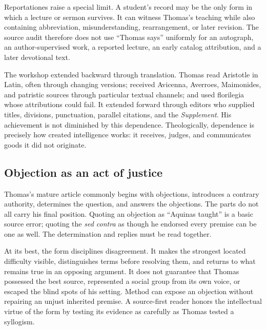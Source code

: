 Reportationes raise a special limit.  A student's record may be the only form
in which a lecture or sermon survives.  It can witness Thomas's teaching while
also containing abbreviation, misunderstanding, rearrangement, or later
revision.  The source audit therefore does not use ``Thomas says'' uniformly
for an autograph, an author-supervised work, a reported lecture, an early
catalog attribution, and a later devotional text.

The workshop extended backward through translation.  Thomas read Aristotle in
Latin, often through changing versions; received Avicenna, Averroes, Maimonides,
and patristic sources through particular textual channels; and used florilegia
whose attributions could fail.  It extended forward through editors who
supplied titles, divisions, punctuation, parallel citations, and the
\emph{Supplement}.  His achievement is not diminished by this dependence.
Theologically, dependence is precisely how created intelligence works: it
receives, judges, and communicates goods it did not originate.

\subsection{Objection as an act of justice}

Thomas's mature article commonly begins with objections, introduces a contrary
authority, determines the question, and answers the objections.  The parts do
not all carry his final position.  Quoting an objection as ``Aquinas taught''
is a basic source error; quoting the \emph{sed contra} as though he endorsed
every premise can be one as well.  The determination and replies must be read
together.

At its best, the form disciplines disagreement.  It makes the strongest
located difficulty visible, distinguishes terms before resolving them, and
returns to what remains true in an opposing argument.  It does not guarantee
that Thomas possessed the best source, represented a social group from its own
voice, or escaped the blind spots of his setting.  Method can expose an
objection without repairing an unjust inherited premise.  A source-first
reader honors the intellectual virtue of the form by testing its evidence as
carefully as Thomas tested a syllogism.
